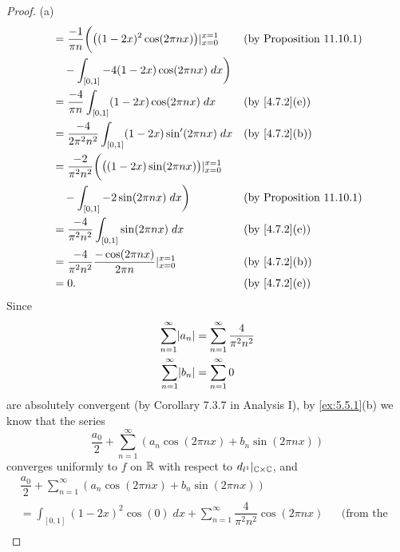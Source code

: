 \begin{proof}{(a)}
\begin{align*}
        & = \dfrac{-1}{\pi n} \bigg(\big((1 - 2x)^2 \cos(2 \pi n x)\big)|_{x = 0}^{x = 1}   &  & \text{(by Proposition 11.10.1)} \\
        & \quad - \int_{[0, 1]} -4 (1 - 2x) \cos(2 \pi n x) \; dx\bigg)                                                          \\
        & = \dfrac{-4}{\pi n} \int_{[0, 1]} (1 - 2x) \cos(2 \pi n x) \; dx                  &  & \text{(by \cref{4.7.2}(e))}     \\
        & = \dfrac{-4}{2 \pi^2 n^2} \int_{[0, 1]} (1 - 2x) \sin'(2 \pi n x) \; dx           &  & \text{(by \cref{4.7.2}(b))}     \\
        & = \dfrac{-2}{\pi^2 n^2} \bigg(\big((1 - 2x) \sin(2 \pi n x)\big)|_{x = 0}^{x = 1}                                      \\
        & \quad - \int_{[0, 1]} -2 \sin(2 \pi n x) \; dx\bigg)                              &  & \text{(by Proposition 11.10.1)} \\
        & = \dfrac{-4}{\pi^2 n^2} \int_{[0, 1]} \sin(2 \pi n x) \; dx                       &  & \text{(by \cref{4.7.2}(e))}     \\
        & = \dfrac{-4}{\pi^2 n^2} \dfrac{-\cos(2 \pi n x)}{2 \pi n}|_{x = 0}^{x = 1}        &  & \text{(by \cref{4.7.2}(b))}     \\
        & = 0.                                                                              &  & \text{(by \cref{4.7.2}(e))}
  \end{align*}
  Since
  \begin{align*}
    \sum_{n = 1}^\infty \abs{a_n} & = \sum_{n = 1}^\infty \dfrac{4}{\pi^2 n^2} \\
    \sum_{n = 1}^\infty \abs{b_n} & = \sum_{n = 1}^\infty 0
  \end{align*}
  are absolutely convergent (by Corollary 7.3.7 in Analysis I), by \cref{ex:5.5.1}(b) we know that the series
  \[
    \dfrac{a_0}{2} + \sum_{n = 1}^\infty (a_n \cos(2 \pi n x) + b_n \sin(2 \pi n x))
  \]
  converges uniformly to \(f\) on \(\mathbb{R}\) with respect to \(d_{l^1}|_{\mathbb{C} \times \mathbb{C}}\), and
  \begin{align*}
     & \dfrac{a_0}{2} + \sum_{n = 1}^\infty (a_n \cos(2 \pi n x) + b_n \sin(2 \pi n x))                                                                                                 \\
     & = \int_{[0, 1]} (1 - 2x)^2 \cos(0) \; dx + \sum_{n = 1}^\infty \dfrac{4}{\pi^2 n^2} \cos(2 \pi n x)                                           &  & \text{(from the proof above)} \\

\end{align*}
\end{proof}
